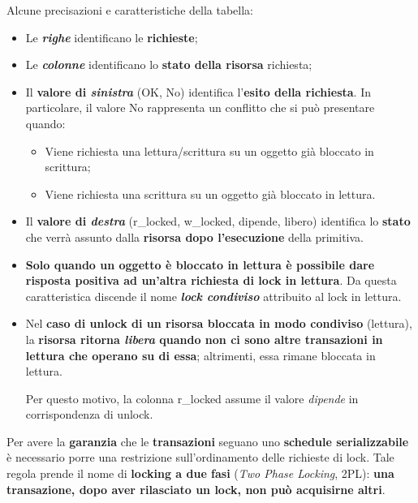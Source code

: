\documentclass[a4paper]{article}
\begin{document}
	\noindent
	Alcune precisazioni e caratteristiche della tabella:
	\begin{itemize}
		\item Le \textbf{\emph{righe}} identificano le \textbf{richieste};
	
		\item Le \textbf{\emph{colonne}} identificano lo \textbf{stato della risorsa} richiesta;
	
		\item Il \textbf{valore di \emph{sinistra}} (OK, No) identifica l'\textbf{esito della richiesta}. In particolare, il valore No rappresenta un conflitto che si può presentare quando:
		\begin{itemize}
			\item Viene richiesta una lettura/scrittura su un oggetto già bloccato in scrittura;
			
			\item Viene richiesta una scrittura su un oggetto già bloccato in lettura.
		\end{itemize}
	
		\item Il \textbf{valore di \emph{destra}} (\textsf{r\_locked}, \textsf{w\_locked}, dipende, libero) identifica lo \textbf{stato} che verrà assunto dalla \textbf{risorsa dopo l'esecuzione} della primitiva.
		
		\item \textbf{Solo quando un oggetto è bloccato in lettura è possibile dare risposta positiva ad un'altra richiesta di lock in lettura}. Da questa caratteristica discende il nome \textbf{\emph{lock condiviso}} attribuito al lock in lettura.
		
		\item Nel \textbf{caso di \textsf{unlock} di un risorsa bloccata in modo condiviso} (lettura), la \textbf{risorsa ritorna \emph{libera} quando non ci sono altre transazioni in lettura che operano su di essa}; altrimenti, essa rimane bloccata in lettura.
		
		Per questo motivo, la colonna \textsf{r\_locked} assume il valore \emph{dipende} in corrispondenza di \textsf{unlock}.
	\end{itemize}
	Per avere la \textbf{garanzia} che le \textbf{transazioni} seguano uno \textbf{schedule serializzabile} è necessario porre una restrizione sull'ordinamento delle richieste di lock. Tale regola prende il nome di \textcolor{Red3}{\textbf{locking a due fasi}} (\emph{Two Phase Locking}, 2PL): \textbf{una transazione, dopo aver rilasciato un lock, non può acquisirne altri}.
	
\end{document}
